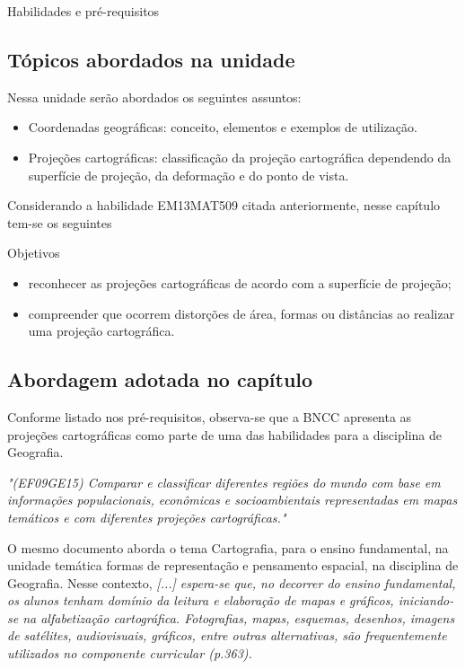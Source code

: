 \begin{apresentacao}{Habilidades e pré-requisitos}
{\subsection{Tópicos abordados na unidade}
Nessa unidade serão abordados os seguintes assuntos:
\begin{itemize}
\item Coordenadas geográficas: conceito, elementos e exemplos de utilização.
\item Projeções cartográficas: classificação da projeção cartográfica dependendo da superfície de projeção, da deformação e do ponto de vista.
\end{itemize}
	

Considerando a habilidade EM13MAT509 citada anteriormente, nesse capítulo tem-se os seguintes
\begin{habilities}{Objetivos}
\begin{itemize}
\item reconhecer as projeções cartográficas de acordo com a superfície de projeção;
\item compreender que ocorrem distorções de área, formas ou distâncias ao realizar uma projeção cartográfica. 
\end{itemize}
\end{habilities}

\subsection{Abordagem adotada no capítulo}

Conforme listado nos pré-requisitos, observa-se que a BNCC  apresenta as projeções cartográficas como parte de uma das habilidades para a disciplina de Geografia.

\textit{"(EF09GE15) Comparar e classificar diferentes regiões do mundo com base em informações populacionais, econômicas e socioambientais representadas em mapas temáticos e com diferentes projeções cartográficas."{} \citep[p. 395]{BNCC2018}}

O mesmo documento aborda o tema Cartografia, para o ensino fundamental, na unidade temática formas de representação e pensamento espacial, na disciplina de Geografia. Nesse contexto, 
\textit{[...] espera-se que, no decorrer do ensino fundamental, os alunos tenham domínio da leitura e elaboração de mapas e gráficos, iniciando-se na alfabetização cartográfica. Fotografias, mapas, esquemas, desenhos, imagens de satélites, audiovisuais, gráficos, entre outras alternativas, são frequentemente utilizados no componente curricular (p.363). }

}
\end{apresentacao}
